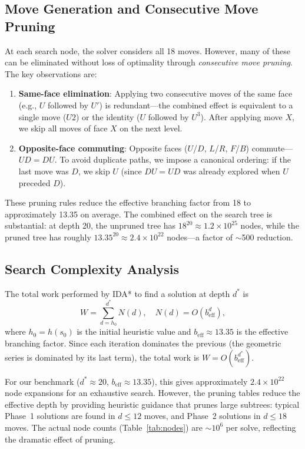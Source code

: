 \documentclass[conference]{IEEEtran}
\begin{document}
\subsection{Move Generation and Consecutive Move Pruning}
\label{sec:move-pruning}

At each search node, the solver considers all 18 moves. However, many of these can be eliminated without loss of optimality through \emph{consecutive move pruning}. The key observations are:

\begin{enumerate}[leftmargin=*]
  \item \textbf{Same-face elimination}: Applying two consecutive moves of the same face (e.g., $U$ followed by $U'$) is redundant---the combined effect is equivalent to a single move ($U2$) or the identity ($U$ followed by $U^3$). After applying move $X$, we skip all moves of face $X$ on the next level.
  \item \textbf{Opposite-face commuting}: Opposite faces ($U$/$D$, $L$/$R$, $F$/$B$) commute---$UD = DU$. To avoid duplicate paths, we impose a canonical ordering: if the last move was $D$, we skip $U$ (since $DU = UD$ was already explored when $U$ preceded $D$).
\end{enumerate}

These pruning rules reduce the effective branching factor from 18 to approximately 13.35 on average. The combined effect on the search tree is substantial: at depth 20, the unpruned tree has $18^{20} \approx 1.2 \times 10^{25}$ nodes, while the pruned tree has roughly $13.35^{20} \approx 2.4 \times 10^{22}$ nodes---a factor of $\sim$500 reduction.

\subsection{Search Complexity Analysis}
\label{sec:complexity}

The total work performed by IDA* to find a solution at depth $d^*$ is
\begin{equation}
W = \sum_{d=h_0}^{d^*} N(d), \quad N(d) = O(b_{\text{eff}}^d),
\end{equation}
where $h_0 = h(s_0)$ is the initial heuristic value and $b_{\text{eff}} \approx 13.35$ is the effective branching factor. Since each iteration dominates the previous (the geometric series is dominated by its last term), the total work is $W = O(b_{\text{eff}}^{d^*})$.

For our benchmark ($d^* \approx 20$, $b_{\text{eff}} \approx 13.35$), this gives approximately $2.4 \times 10^{22}$ node expansions for an exhaustive search. However, the pruning tables reduce the effective depth by providing heuristic guidance that prunes large subtrees: typical Phase~1 solutions are found in $d \leq 12$ moves, and Phase~2 solutions in $d \leq 18$ moves. The actual node counts (Table~\ref{tab:nodes}) are $\sim 10^6$ per solve, reflecting the dramatic effect of pruning.
\end{document}
